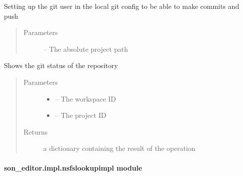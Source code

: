 \documentclass[letterpaper,10pt,english]{sphinxmanual}
\begin{document}

\begin{fulllineitems}
\label{_source/son_editor.impl:son_editor.impl.gitimpl.setup_git_user_email}
Setting up the git user in the local git config to be able to make commits and push
\begin{quote}\begin{description}
\item[{Parameters}] \leavevmode
{} -- The absolute project path

\end{description}\end{quote}

\end{fulllineitems}


\begin{fulllineitems}
\label{_source/son_editor.impl:son_editor.impl.gitimpl.status}
Shows the git status of the repository
\begin{quote}\begin{description}
\item[{Parameters}] \leavevmode\begin{itemize}
\item {} 
 -- The workspace ID

\item {} 
 -- The project ID

\end{itemize}

\item[{Returns}] \leavevmode
a dictionary containing the result of the operation

\end{description}\end{quote}

\end{fulllineitems}



\paragraph{son\_editor.impl.nsfslookupimpl module}
\label{_source/son_editor.impl:module-son_editor.impl.nsfslookupimpl}\label{_source/son_editor.impl:son-editor-impl-nsfslookupimpl-module}
\end{document}
